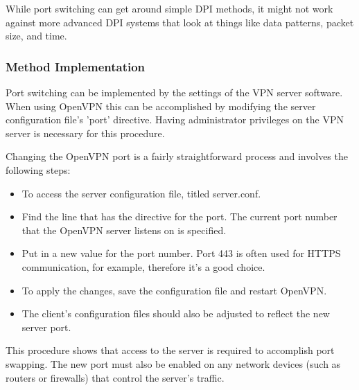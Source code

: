 \documentclass[12pt, fleqn, a4paper]{article}
\begin{document}
While port switching can get around simple DPI methods, it might not work against more advanced DPI systems that look at things like data patterns, packet size, and time.
\subsubsection{Method Implementation}
Port switching can be implemented by the settings of the VPN server software. When using OpenVPN this can be accomplished by modifying the server configuration file's 'port' directive. Having administrator privileges on the VPN server is necessary for this procedure.

Changing the OpenVPN port is a fairly straightforward process and involves the following steps:
\begin{itemize}
\item To access the server configuration file, titled server.conf.
\item Find the line that has the directive for the port. The current port number that the OpenVPN server listens on is specified.
\item Put in a new value for the port number. Port 443 is often used for HTTPS communication, for example, therefore it's a good choice.
\item To apply the changes, save the configuration file and restart OpenVPN.
\item The client's configuration files should also be adjusted to reflect the new server port.
\end{itemize}

This procedure shows that access to the server is required to accomplish port swapping. The new port must also be enabled on any network devices (such as routers or firewalls) that control the server's traffic.
\end{document}
